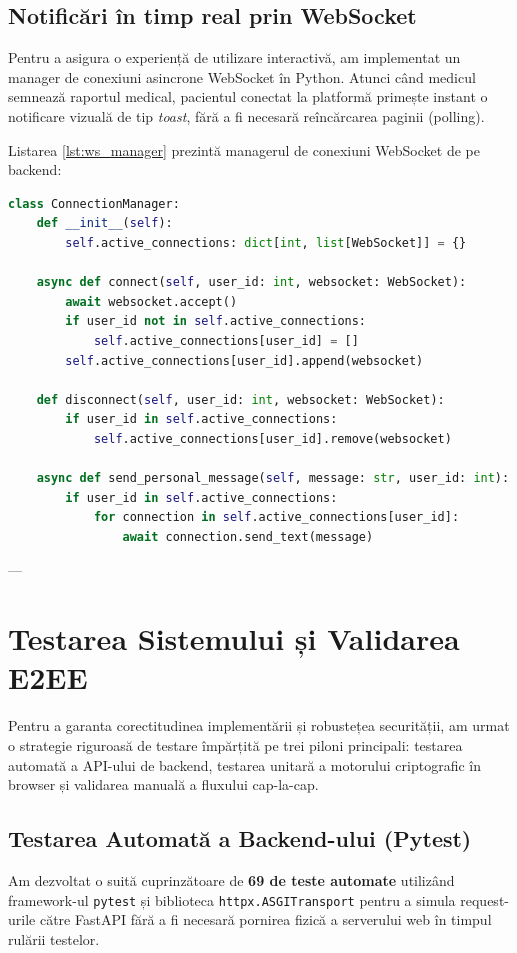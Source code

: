 \subsection{Notificări în timp real prin WebSocket}
Pentru a asigura o experiență de utilizare interactivă, am implementat un manager de conexiuni asincrone WebSocket în Python. Atunci când medicul semnează raportul medical, pacientul conectat la platformă primește instant o notificare vizuală de tip \textit{toast}, fără a fi necesară reîncărcarea paginii (polling).

Listarea \ref{lst:ws_manager} prezintă managerul de conexiuni WebSocket de pe backend:

\begin{lstlisting}[language=Python, caption={Managerul de conexiuni asincrone WebSocket responsabil cu trimiterea notificărilor instantanee.}, label=lst:ws_manager]
class ConnectionManager:
    def __init__(self):
        self.active_connections: dict[int, list[WebSocket]] = {}

    async def connect(self, user_id: int, websocket: WebSocket):
        await websocket.accept()
        if user_id not in self.active_connections:
            self.active_connections[user_id] = []
        self.active_connections[user_id].append(websocket)

    def disconnect(self, user_id: int, websocket: WebSocket):
        if user_id in self.active_connections:
            self.active_connections[user_id].remove(websocket)

    async def send_personal_message(self, message: str, user_id: int):
        if user_id in self.active_connections:
            for connection in self.active_connections[user_id]:
                await connection.send_text(message)
\end{lstlisting}

---

\section{Testarea Sistemului și Validarea E2EE}
\label{sec:ch4sec4}

Pentru a garanta corectitudinea implementării și robustețea securității, am urmat o strategie riguroasă de testare împărțită pe trei piloni principali: testarea automată a API-ului de backend, testarea unitară a motorului criptografic în browser și validarea manuală a fluxului cap-la-cap.

\subsection{Testarea Automată a Backend-ului (Pytest)}
Am dezvoltat o suită cuprinzătoare de \textbf{69 de teste automate} utilizând framework-ul \texttt{pytest} și biblioteca \texttt{httpx.ASGITransport} pentru a simula request-urile către FastAPI fără a fi necesară pornirea fizică a serverului web în timpul rulării testelor. 

